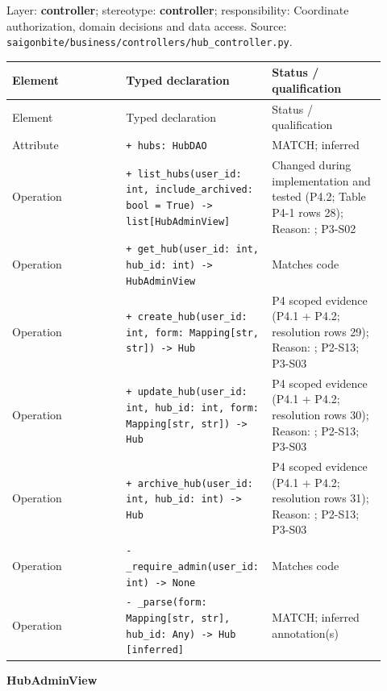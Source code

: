 Layer: \textbf{controller}; stereotype: \textbf{\guillemotleft{}controller\guillemotright{}}; responsibility: Coordinate authorization, domain decisions and data access. Source: \texttt{saigonbite/\allowbreak{}business/\allowbreak{}controllers/\allowbreak{}hub\_\allowbreak{}controller.\allowbreak{}py}.

\begin{longtable}{>{\raggedright\arraybackslash}p{0.3067\linewidth}>{\raggedright\arraybackslash}p{0.3067\linewidth}>{\raggedright\arraybackslash}p{0.3067\linewidth}}
Element & Typed declaration & Status / qualification \\
\hline\endfirsthead
Element & Typed declaration & Status / qualification \\
\hline\endhead
Attribute & \texttt{+ hubs: HubDAO} & MATCH; inferred \\
Operation & \texttt{+ list\_\allowbreak{}hubs(user\_\allowbreak{}id: int, include\_\allowbreak{}archived: bool = True) -\textgreater{} list[HubAdminView] } & Changed during implementation and tested (P4.2; Table P4-1 rows 28); Reason: ; P3-S02 \\
Operation & \texttt{+ get\_\allowbreak{}hub(user\_\allowbreak{}id: int, hub\_\allowbreak{}id: int) -\textgreater{} HubAdminView} & Matches code \\
Operation & \texttt{+ create\_\allowbreak{}hub(user\_\allowbreak{}id: int, form: Mapping[str, str]) -\textgreater{} Hub } & P4 scoped evidence (P4.1 + P4.2; resolution rows 29); Reason: ; P2-S13; P3-S03 \\
Operation & \texttt{+ update\_\allowbreak{}hub(user\_\allowbreak{}id: int, hub\_\allowbreak{}id: int, form: Mapping[str, str]) -\textgreater{} Hub } & P4 scoped evidence (P4.1 + P4.2; resolution rows 30); Reason: ; P2-S13; P3-S03 \\
Operation & \texttt{+ archive\_\allowbreak{}hub(user\_\allowbreak{}id: int, hub\_\allowbreak{}id: int) -\textgreater{} Hub } & P4 scoped evidence (P4.1 + P4.2; resolution rows 31); Reason: ; P2-S13; P3-S03 \\
Operation & \texttt{- \_\allowbreak{}require\_\allowbreak{}admin(user\_\allowbreak{}id: int) -\textgreater{} None} & Matches code \\
Operation & \texttt{- \_\allowbreak{}parse(form: Mapping[str, str], hub\_\allowbreak{}id: Any) -\textgreater{} Hub [inferred]} & MATCH; inferred annotation(s) \\
\end{longtable}
\textbf{HubAdminView}

